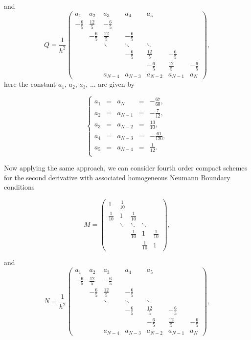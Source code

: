 {and $$ Q = \frac{1}{h^2} \begin{pmatrix}
a_1 & a_2 & a_3 & a_4 & a_5 &   &   \\ 
-\frac{6}{5} & \frac{12}{5} & -\frac{6}{5} &   &   &   &   \\ 
  & -\frac{6}{5} & \frac{12}{5} & -\frac{6}{5} &   &   &   \\ 
  &   & \ddots & \ddots & \ddots &   &   \\ 
  &   &   & -\frac{6}{5} & \frac{12}{5} & -\frac{6}{5} &   \\ 
  &   &   &   & -\frac{6}{5} & \frac{12}{5} & -\frac{6}{5} \\ 
  &   & a_{N-4} & a_{N-3} & a_{N-2} & a_{N-1} & a_N
\end{pmatrix}, $$
here the constant  $a_1$, $a_2$, $a_3$, ... are given by

$$ \left\lbrace \begin{array}{rcccl}
a_1&=&a_{N}&=&-\frac{67}{60},   \\
a_2&=&a_{N-1}&=&-\frac{7}{12},   \\
a_3&=&a_{N-2}&=&\frac{13}{10},   \\
a_4&=&a_{N-3}&=&-\frac{61}{120},   \\
a_5&=&a_{N-4}&=&\frac{1}{12}.   \\
\end{array}  \right.  $$

Now applying the same approach, we can consider fourth order compact schemes for the second derivative with associated homogeneous Neumann Boundary conditions

$$ M= \begin{pmatrix}
1 & \frac{1}{10} &   &   &   \\ 
\frac{1}{10} & 1 & \frac{1}{10} &   &   \\ 
  & \ddots & \ddots & \ddots &   \\ 
  &  & \frac{1}{10} & 1 & \frac{1}{10} \\ 
 &  &  & \frac{1}{10} & 1
\end{pmatrix}, $$ 

and $$ N = \frac{1}{h^2} \begin{pmatrix}
a_1 & a_2 & a_3 & a_4 & a_5 &   &   \\ 
-\frac{6}{5} & \frac{12}{5} & -\frac{6}{5} &   &   &   &   \\ 
  & -\frac{6}{5} & \frac{12}{5} & -\frac{6}{5} &   &   &   \\ 
  &   & \ddots & \ddots & \ddots &   &   \\ 
  &   &   & -\frac{6}{5} & \frac{12}{5} & -\frac{6}{5} &   \\ 
  &   &   &   & -\frac{6}{5} & \frac{12}{5} & -\frac{6}{5} \\ 
  &   & a_{N-4} & a_{N-3} & a_{N-2} & a_{N-1} & a_N
\end{pmatrix}, $$

}
